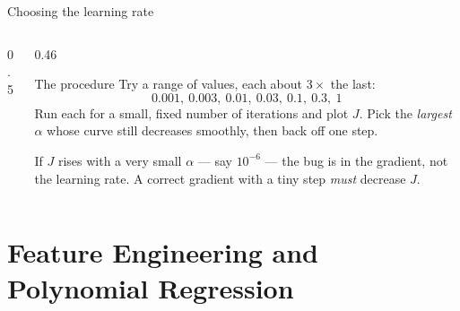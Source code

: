 \documentclass[aspectratio=169,10pt]{beamer}
\begin{document}
\begin{frame}{Choosing the learning rate}
  \footnotesize
  \begin{columns}[T,onlytextwidth]
    \begin{column}{0.5\textwidth}
      \par
    \end{column}
    \begin{column}{0.46\textwidth}
      \begin{block}{The procedure}
        Try a range of values, each about $3\times$ the last:
        \[ 0.001,\ 0.003,\ 0.01,\ 0.03,\ 0.1,\ 0.3,\ 1 \]
        Run each for a small, fixed number of iterations and plot $J$. Pick the
        \emph{largest} $\alpha$ whose curve still decreases smoothly, then back off one step.
      \end{block}
      \begin{pitfall}
        If $J$ rises with a very small $\alpha$ --- say $10^{-6}$ --- the bug is in the
        gradient, not the learning rate. A correct gradient with a tiny step \emph{must}
        decrease $J$.
      \end{pitfall}
    \end{column}
  \end{columns}
\end{frame}

\section{Feature Engineering and Polynomial Regression}
\end{document}
